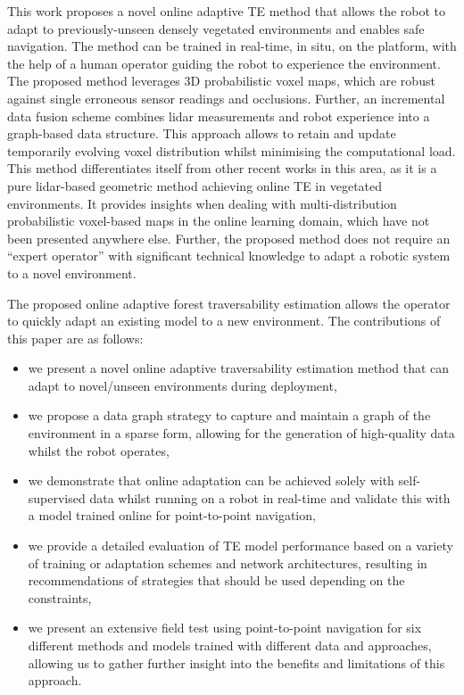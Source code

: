 This work proposes a novel online adaptive TE method that allows the robot to adapt to previously-unseen densely vegetated environments and enables safe navigation. The method can be trained in real-time, in situ, on the platform, with the help of a human operator guiding the robot to experience the environment. The proposed method leverages 3D probabilistic voxel maps, which are robust against single erroneous sensor readings and occlusions. Further,  an incremental data fusion scheme combines lidar measurements and robot experience into a graph-based data structure. This approach allows to retain and update temporarily evolving voxel distribution whilst minimising the computational load. This method differentiates itself from other recent works in this area, as it is a pure lidar-based geometric method achieving online \ac{TE} in vegetated environments. It provides insights when dealing with multi-distribution probabilistic voxel-based maps in the online learning domain, which have not been presented anywhere else. Further, the proposed method does not require an ``expert operator''  with significant technical knowledge to adapt a robotic system to a novel environment.

The proposed online adaptive forest traversability estimation allows the operator to quickly adapt an existing model to a new environment. The contributions of this paper are as follows: 
\begin{itemize}
 \item we present a novel online adaptive traversability estimation method that can adapt to novel/unseen environments during deployment,
 \item we propose a data graph strategy to capture and maintain a graph of the environment in a sparse form, allowing for the generation of high-quality data whilst the robot operates,
 \item we demonstrate that online adaptation can be achieved solely with self-supervised data whilst running on a robot in real-time and validate this with a model trained online for point-to-point navigation,
 \item we provide a detailed evaluation of \ac{TE} model performance based on a variety of training or adaptation schemes and network architectures, resulting in recommendations of strategies that should be used depending on the constraints,
 \item we present an extensive field test using point-to-point navigation for six different methods and models trained with different data and approaches, allowing us to gather further insight into the benefits and limitations of this approach. 
\end{itemize}


